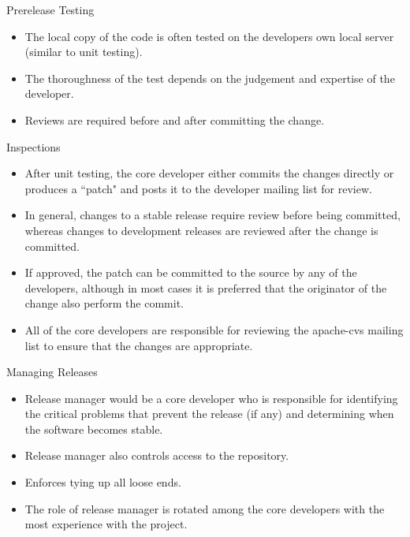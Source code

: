 \documentclass{beamer}
\begin{document}
\begin{frame}{Prerelease Testing}
\begin{itemize}
	\item The local copy of the code is often tested on the developers own local server (similar to unit testing). \pause
	\item The thoroughness of the test depends on the judgement and expertise of the developer. \pause
	\item Reviews are required before and after committing the change.
\end{itemize}
\end{frame}

\begin{frame}{Inspections}
\begin{itemize}
	\item After unit testing, the core developer either commits the changes directly or produces a ``patch" and posts it to the developer mailing list for review. \pause
	\item In general, changes to a stable release require review before being committed, whereas changes to development releases are reviewed after the change is committed. \pause
	\item If approved, the patch can be committed to the source by any of the developers, although in most cases it is preferred that the originator of the change also perform the commit.\pause
	\item All of the core developers are responsible for reviewing the apache-cvs mailing list to ensure that the changes are appropriate.
\end{itemize}
\end{frame}

\begin{frame}{Managing Releases}
\begin{itemize}
	\item Release manager would be a core developer who is responsible for identifying the critical problems that prevent the release (if any) and determining when the software becomes stable.\pause
	\item Release manager also controls access to the repository.\pause
	\item Enforces tying up all loose ends. \pause
	\item The role of release manager is rotated among the core developers with the most experience with the project.
\end{itemize}
\end{frame}
\end{document}
